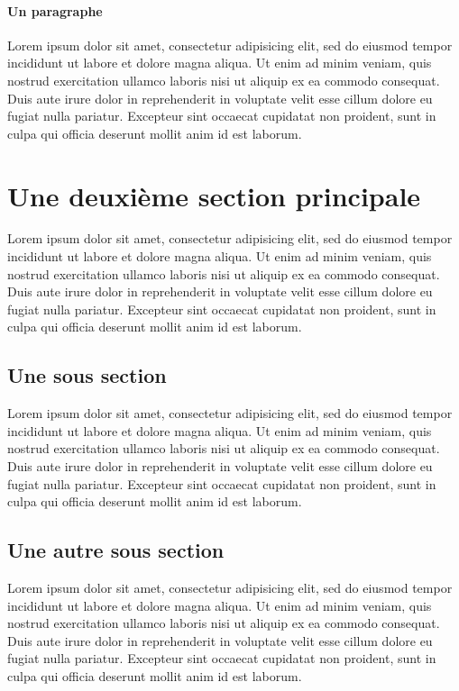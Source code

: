 \paragraph{Un paragraphe}
Lorem ipsum dolor sit amet, consectetur adipisicing elit, sed do eiusmod
tempor incididunt ut labore et dolore magna aliqua. Ut enim ad minim veniam,
quis nostrud exercitation ullamco laboris nisi ut aliquip ex ea commodo
consequat. Duis aute irure dolor in reprehenderit in voluptate velit esse
cillum dolore eu fugiat nulla pariatur. Excepteur sint occaecat cupidatat non
proident, sunt in culpa qui officia deserunt mollit anim id est laborum.

\section{Une deuxième section principale}
Lorem ipsum dolor sit amet, consectetur adipisicing elit, sed do eiusmod
tempor incididunt ut labore et dolore magna aliqua. Ut enim ad minim veniam,
quis nostrud exercitation ullamco laboris nisi ut aliquip ex ea commodo
consequat. Duis aute irure dolor in reprehenderit in voluptate velit esse
cillum dolore eu fugiat nulla pariatur. Excepteur sint occaecat cupidatat non
proident, sunt in culpa qui officia deserunt mollit anim id est laborum.

\subsection{Une sous section}
Lorem ipsum dolor sit amet, consectetur adipisicing elit, sed do eiusmod
tempor incididunt ut labore et dolore magna aliqua. Ut enim ad minim veniam,
quis nostrud exercitation ullamco laboris nisi ut aliquip ex ea commodo
consequat. Duis aute irure dolor in reprehenderit in voluptate velit esse
cillum dolore eu fugiat nulla pariatur. Excepteur sint occaecat cupidatat non
proident, sunt in culpa qui officia deserunt mollit anim id est laborum.

\subsection{Une autre sous section}
Lorem ipsum dolor sit amet, consectetur adipisicing elit, sed do eiusmod
tempor incididunt ut labore et dolore magna aliqua. Ut enim ad minim veniam,
quis nostrud exercitation ullamco laboris nisi ut aliquip ex ea commodo
consequat. Duis aute irure dolor in reprehenderit in voluptate velit esse
cillum dolore eu fugiat nulla pariatur. Excepteur sint occaecat cupidatat non
proident, sunt in culpa qui officia deserunt mollit anim id est laborum.


